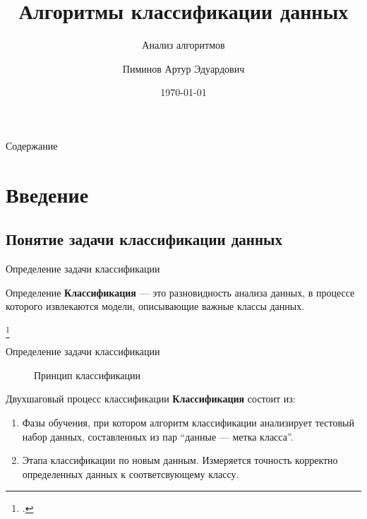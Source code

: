 \documentclass{beamer}
\title %
{Алгоритмы классификации данных}
\subtitle
{Анализ алгоритмов} %
\author[Пиминов А.Э.] %
{Пиминов Артур Эдуардович}
\institute[НГУ] %
{
  Группа 23224\\
  Факультет информационных технологий\\
  Новосибирский государственный университет
}
\date[\today] %
{\today}
\begin{document}
\begin{frame}
  \titlepage
\end{frame}

\begin{frame}{Содержание}
  \tableofcontents
\end{frame}



\section{Введение}

\subsection{Понятие задачи классификации данных}

\begin{frame}{Определение задачи классификации}
  \begin{block}{Определение} 
    \textbf{Классификация} — это разновидность анализа данных, в процессе которого извлекаются модели, описывающие важные классы данных\footnotemark. 
  \end{block}\footcitetext{Jiawei2012}
  \vfill
\end{frame}


\begin{frame}{Определение задачи классификации}
\begin{figure}
    \caption{Принцип классификации}
  \end{figure}
\end{frame}


  


\begin{frame}{Двухшаговый процесс классификации}
  \textbf{Классификация} состоит из:
  \begin{enumerate}
    \item Фазы обучения, при котором алгоритм классификации анализирует тестовый набор данных, составленных из пар ``данные — метка класса''. 
      \pause
    \item Этапа классификации по новым данным. Измеряется точность корректно определенных данных к соответсвующему классу.
  \end{enumerate}
\end{frame}
\end{document}
